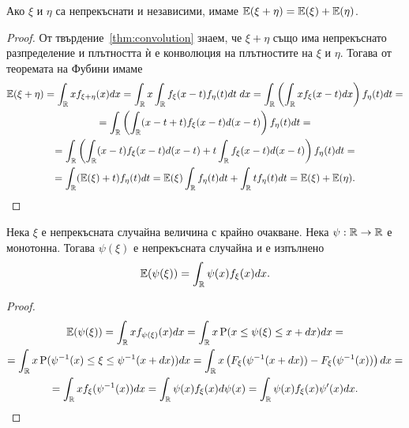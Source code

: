 \documentclass[numbers=endperiod, DIV=15, bibliography=totocnumbered]{scrartcl}
\begin{document}
\begin{proposition}\label{thm:expect-additive}
  Ако $\xi$ и $\eta$ са непрекъснати и независими, имаме $\mathbb{E}(\xi + \eta) = \mathbb{E}(\xi) + \mathbb{E}(\eta)$.
\end{proposition}
\begin{proof}
  От твърдение~\ref{thm:convolution} знаем, че $\xi + \eta$ също има непрекъснато разпределение и плътността ѝ е конволюция на плътностите на $\xi$ и $\eta$. Тогава от теоремата на Фубини имаме
  \begin{multline*}
    \mathbb{E}(\xi + \eta)
    =
    \int_{\mathbb{R}} x f_{\xi + \eta} (x) dx
    =
    \int_{\mathbb{R}} x \int_{\mathbb{R}} f_\xi(x - t) f_\eta(t) dt \; dx
    =
    \int_{\mathbb{R}} \left( \int_{\mathbb{R}} x f_\xi(x - t) dx \right) f_\eta(t) dt
    = \\ =
    \int_{\mathbb{R}} \left( \int_{\mathbb{R}} (x - t + t) f_\xi(x - t) d(x - t) \right) f_\eta(t) dt
    = \\ =
    \int_{\mathbb{R}} \left( \int_{\mathbb{R}} (x - t) f_\xi(x - t) d(x - t) + t \int_{\mathbb{R}} f_\xi(x - t) d(x - t) \right) f_\eta(t) dt
    = \\ =
    \int_{\mathbb{R}} (\mathbb{E}(\xi) + t) f_\eta(t) dt
    =
    \mathbb{E}(\xi) \int_{\mathbb{R}} f_\eta(t) dt + \int_{\mathbb{R}} t f_\eta(t) dt
    =
    \mathbb{E}(\xi) + \mathbb{E}(\eta).
  \end{multline*}
\end{proof}

\begin{proposition}\label{thm:lotus}
  Нека $\xi$ е непрекъсната случайна величина с крайно очакване. Нека $\psi: \mathbb{R} \to \mathbb{R}$ е монотонна. Тогава $\psi(\xi)$ е непрекъсната случайна и е изпълнено
  \begin{displaymath}
    \mathbb{E}(\psi(\xi))
    =
    \int_{\mathbb{R}} \psi(x) f_\xi(x) dx.
  \end{displaymath}
\end{proposition}

\begin{proof}
  \begin{multline*}
    \mathbb{E}(\psi(\xi))
    =
    \int_{\mathbb{R}} x f_{\psi(\xi)}(x) dx
    =
    \int_{\mathbb{R}} x \operatorname{P}(x \leq \psi(\xi) \leq x + dx) dx
    = \\ =
    \int_{\mathbb{R}} x \operatorname{P}(\psi^{-1}(x) \leq \xi \leq \psi^{-1}(x + dx)) dx
    =
    \int_{\mathbb{R}} x \left( F_\xi(\psi^{-1}(x + dx)) - F_\xi(\psi^{-1}(x)) \right) dx
    = \\ =
    \int_{\mathbb{R}} x f_\xi(\psi^{-1}(x)) dx
    =
    \int_{\mathbb{R}} \psi(x) f_\xi(x) d \psi(x)
    =
    \int_{\mathbb{R}} \psi(x) f_\xi(x) \psi'(x) dx.
  \end{multline*}
\end{proof}
\end{document}
